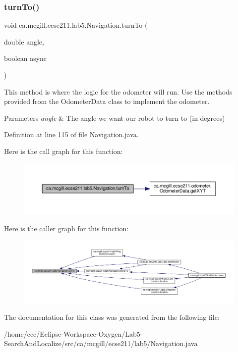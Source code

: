 \subsubsection{\texorpdfstring{turn\+To()}{turnTo()}}
{\footnotesize\ttfamily void ca.\+mcgill.\+ecse211.\+lab5.\+Navigation.\+turn\+To (\begin{DoxyParamCaption}\item[{double}]{angle,  }\item[{boolean}]{async }\end{DoxyParamCaption})}

This method is where the logic for the odometer will run. Use the methods provided from the Odometer\+Data class to implement the odometer.


\begin{DoxyParams}{Parameters}
{\em angle} & The angle we want our robot to turn to (in degrees) \\
\hline
\end{DoxyParams}


Definition at line 115 of file Navigation.\+java.

Here is the call graph for this function\+:
\nopagebreak
\begin{figure}[H]
\begin{center}
\leavevmode
\includegraphics[width=350pt]{classca_1_1mcgill_1_1ecse211_1_1lab5_1_1_navigation_a2b39928c8062fe6863de8e818d009e91_cgraph}
\end{center}
\end{figure}
Here is the caller graph for this function\+:
\nopagebreak
\begin{figure}[H]
\begin{center}
\leavevmode
\includegraphics[width=350pt]{classca_1_1mcgill_1_1ecse211_1_1lab5_1_1_navigation_a2b39928c8062fe6863de8e818d009e91_icgraph}
\end{center}
\end{figure}


The documentation for this class was generated from the following file\+:\begin{DoxyCompactItemize}
\item 
/home/ccc/\+Eclipse-\/\+Workspace-\/\+Oxygen/\+Lab5-\/\+Search\+And\+Localize/src/ca/mcgill/ecse211/lab5/Navigation.\+java\end{DoxyCompactItemize}
